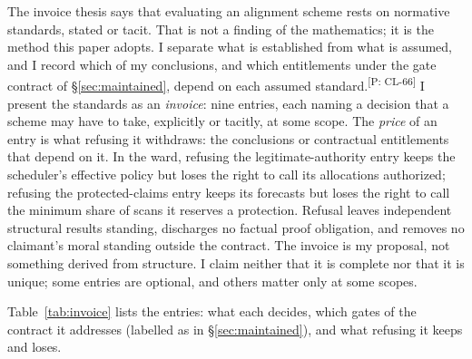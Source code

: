 \documentclass[pdflatex,sn-basic]{sn-jnl}%
\newcommand{\slot}[1]{}%
\newcommand{\claim}[2]{\ifannotated\textsuperscript{\textcolor{blue!60!black}{\tiny[#1: #2]}}\fi}
\begin{document}
\slot{7.1}
The invoice thesis says that evaluating an alignment scheme rests on normative standards, stated or tacit. That is not a finding of the mathematics; it is the method this paper adopts. I separate what is established from what is assumed, and I record which of my conclusions, and which entitlements under the gate contract of \S\ref{sec:maintained}, depend on each assumed standard.\claim{P}{CL-66} I present the standards as an \emph{invoice}: nine entries, each naming a decision that a scheme may have to take, explicitly or tacitly, at some scope. The \emph{price} of an entry is what refusing it withdraws: the conclusions or contractual entitlements that depend on it. In the ward, refusing the legitimate-authority entry keeps the scheduler's effective policy but loses the right to call its allocations authorized; refusing the protected-claims entry keeps its forecasts but loses the right to call the minimum share of scans it reserves a protection. Refusal leaves independent structural results standing, discharges no factual proof obligation, and removes no claimant's moral standing outside the contract. The invoice is my proposal, not something derived from structure. I claim neither that it is complete nor that it is unique; some entries are optional, and others matter only at some scopes.

\slot{7.2}
Table~\ref{tab:invoice} lists the entries: what each decides, which gates of the contract it addresses (labelled as in \S\ref{sec:maintained}), and what refusing it keeps and loses.
\end{document}
